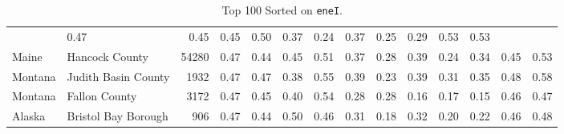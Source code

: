 \documentclass[10pt, letterpaper]{article}
\begin{document}
\begin{spacing}{1.4}
\begin{table}
{\begin{tabular}{llrrrrrrrrrrrr}
    & 0.47 & 0.45 & 0.45 & 0.50 & 0.37 & 0.24 & 0.37
    & 0.25 & 0.29 & 0.53 & 0.53 \\ Maine & Hancock County &
    54280 & 0.47 & 0.44 & 0.45 & 0.51 & 0.37 & 0.28 &
    0.39 & 0.24 & 0.34 & 0.45 & 0.53 \\ Montana & Judith
    Basin County & 1932 & 0.47 & 0.47 & 0.38 & 0.55 & 0.39 &
    0.23 & 0.39 & 0.31 & 0.35 & 0.48 & 0.58 \\ Montana &
    Fallon County & 3172 & 0.47 & 0.45 & 0.40 & 0.54 & 0.28
    & 0.28 & 0.16 & 0.17 & 0.15 & 0.46 & 0.47 \\ Alaska
    & Bristol Bay Borough & 906 & 0.47 & 0.44 & 0.50 & 0.46 &
    0.31 & 0.18 & 0.32 & 0.20 & 0.22 & 0.46 & 0.48
    \\ \hline \end{tabular}
}
  \caption{Top 100 Sorted on \texttt{eneI}.}
\end{table}


\end{spacing}
\end{document}
